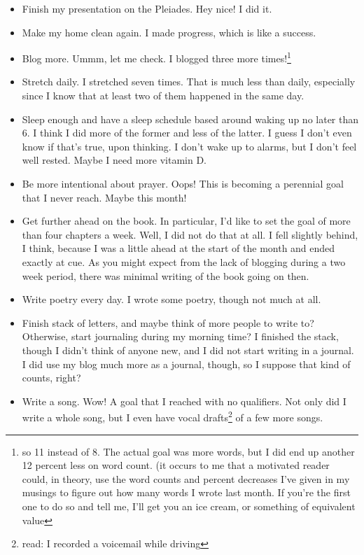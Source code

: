 \documentclass[12pt]{article}[titlepage]
\renewcommand{\,}{\textsuperscript{,}}
\begin{document}
\begin{itemize}
\item Finish my presentation on the Pleiades.
Hey nice! I did it.
\item Make my home clean again.
I made progress, which is like a success.
\item Blog more.
Ummm, let me check.
I blogged three more times!\footnote{so 11 instead of 8.
The actual goal was more words, but I did end up another 12 percent less on word count.
(it occurs to me that a motivated reader could, in theory, use the word counts and percent decreases I've given in my musings to figure out how many words I wrote last month.
If you're the first one to do so and tell me, I'll get you an ice cream, or something of equivalent value}
\item Stretch daily.
I stretched seven times.
That is much less than daily, especially since I know that at least two of them happened in the same day.
\item Sleep enough and have a sleep schedule based around waking up no later than 6.
I think I did more of the former and less of the latter.
I guess I don't even know if that's true, upon thinking.
I don't wake up to alarms, but I don't feel well rested.
Maybe I need more vitamin D.
\item Be more intentional about prayer.
Oops!
This is becoming a perennial goal that I never reach.
Maybe this month!
\item Get further ahead on the book.
In particular, I'd like to set the goal of more than four chapters a week.
Well, I did not do that at all.
I fell slightly behind, I think, because I was a little ahead at the start of the month and ended exactly at cue.
As you might expect from the lack of blogging during a two week period, there was minimal writing of the book going on then.
\item Write poetry every day.
I wrote some poetry, though not much at all.
\item Finish stack of letters, and maybe think of more people to write to? Otherwise, start journaling during my morning time?
I finished the stack, though I didn't think of anyone new, and I did not start writing in a journal.
I did use my blog much more as a journal, though, so I suppose that kind of counts, right?
\item Write a song.
Wow! A goal that I reached with no qualifiers.
Not only did I write a whole song, but I even have vocal drafts\footnote{read: I recorded a voicemail while driving} of a few more songs.
\end{itemize}
\end{document}
